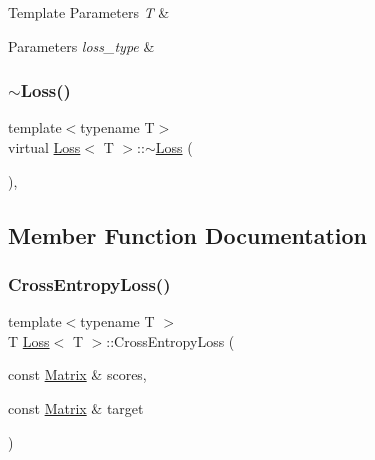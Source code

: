 \begin{DoxyTemplParams}{Template Parameters}
{\em T} & \\
\hline
\end{DoxyTemplParams}

\begin{DoxyParams}{Parameters}
{\em loss\+\_\+type} & \\
\hline
\end{DoxyParams}
\mbox{\label{class_loss_a93b96fb49b4fedae50e1b275062d9cc5}} 
\subsubsection{\texorpdfstring{$\sim$Loss()}{~Loss()}}
{\footnotesize\ttfamily template$<$typename T$>$ \\
virtual \mbox{\hyperlink{class_loss}{Loss}}$<$ T $>$\+::$\sim$\mbox{\hyperlink{class_loss}{Loss}} (\begin{DoxyParamCaption}{ }\end{DoxyParamCaption})\hspace{0.3cm}{\ttfamily [virtual]}, {\ttfamily [default]}}



\subsection{Member Function Documentation}
\mbox{\label{class_loss_ad9278bd08a8e63a856f317b58c73195b}} 
\subsubsection{\texorpdfstring{CrossEntropyLoss()}{CrossEntropyLoss()}}
{\footnotesize\ttfamily template$<$typename T $>$ \\
T \mbox{\hyperlink{class_loss}{Loss}}$<$ T $>$\+::Cross\+Entropy\+Loss (\begin{DoxyParamCaption}\item[{const \mbox{\hyperlink{class_loss_a0cb2ca4ba669a18f628d747a995cd26c}{Matrix}} \&}]{scores,  }\item[{const \mbox{\hyperlink{class_loss_a0cb2ca4ba669a18f628d747a995cd26c}{Matrix}} \&}]{target }\end{DoxyParamCaption})\hspace{0.3cm}{\ttfamily [virtual]}}


